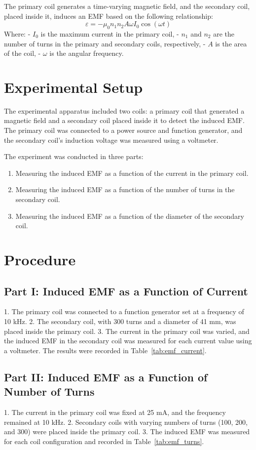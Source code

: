 \documentclass[journal]{IEEEtran}
\begin{document}
The primary coil generates a time-varying magnetic field, and the secondary coil, placed inside it, induces an EMF based on the following relationship:
\begin{equation}
    \varepsilon = - \mu_0 n_1 n_2 A \omega I_0 \cos(\omega t)
\end{equation}
Where:
- \(I_0\) is the maximum current in the primary coil,
- \(n_1\) and \(n_2\) are the number of turns in the primary and secondary coils, respectively,
- \(A\) is the area of the coil,
- \(\omega\) is the angular frequency.

\section{Experimental Setup}
The experimental apparatus included two coils: a primary coil that generated a magnetic field and a secondary coil placed inside it to detect the induced EMF. The primary coil was connected to a power source and function generator, and the secondary coil’s induction voltage was measured using a voltmeter.

The experiment was conducted in three parts:
\begin{enumerate}
    \item Measuring the induced EMF as a function of the current in the primary coil.
    \item Measuring the induced EMF as a function of the number of turns in the secondary coil.
    \item Measuring the induced EMF as a function of the diameter of the secondary coil.
\end{enumerate}

\section{Procedure}
\subsection{Part I: Induced EMF as a Function of Current}
1. The primary coil was connected to a function generator set at a frequency of 10 kHz.
2. The secondary coil, with 300 turns and a diameter of 41 mm, was placed inside the primary coil.
3. The current in the primary coil was varied, and the induced EMF in the secondary coil was measured for each current value using a voltmeter. The results were recorded in Table~\ref{tab:emf_current}.

\subsection{Part II: Induced EMF as a Function of Number of Turns}
1. The current in the primary coil was fixed at 25 mA, and the frequency remained at 10 kHz.
2. Secondary coils with varying numbers of turns (100, 200, and 300) were placed inside the primary coil.
3. The induced EMF was measured for each coil configuration and recorded in Table~\ref{tab:emf_turns}.
\end{document}
